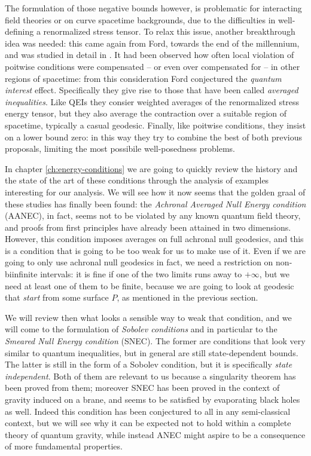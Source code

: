 The formulation of those negative bounds however, is problematic for interacting field theories or on curve spacetime backgrounds, due to the difficulties in well-defining a renormalized stress tensor. To relax this issue, another breakthrough idea was needed: this came again from Ford, towards the end of the millennium, and was studied in detail in \cite[]{ford1999quantum}. It had been observed how often local violation of poitwise conditions were compensated -- or even over compensated for -- in other regions of spacetime: from this consideration Ford conjectured the \emph{quantum interest} effect. Specifically they give rise to those that have been called \emph{averaged inequalities}. Like QEIs they consier weighted averages of the renormalized stress energy tensor, but they also average the contraction over a suitable region of spacetime, typically a casual geodesic. Finally, like poitwise conditions, they insist on a lower bound zero: in this way they try to combine the best of both previous proposals, limiting the most possibile well-posedness problems.

In chapter \ref{ch:energy-conditions} we are going to quickly review the history and the state of the art of these conditions through the analysis of examples interesting for our analysis. We will see how it now seems that the golden graal of these studies has finally been found: the \emph{Achronal Averaged Null Energy condition} (AANEC), in fact, seems not to be violated by any known quantum field theory, and proofs from first principles have already been attained in two dimensions. However, this condition imposes averages on full achronal null geodesics, and this is a condition that is going to be too weak for us to make use of it.
Even if we are going to only use achronal null geodesics in fact, we need a restriction on non-biinfinite intervals: it is fine if one of the two limits runs away to \(+\infty\), but we need at least one of them to be finite, because we are going to look at geodesic that \emph{start} from some surface \(P\), as mentioned in the previous section.

We will review then what looks a sensible way to weak that condition, and we will come to the formulation of \emph{Sobolev conditions} and in particular to the \emph{Smeared Null Energy condition} (SNEC). The former are conditions that look very similar to quantum inequalities, but in general are still state-dependent bounds. The latter is still in the form of a Sobolev condition, but it is specifically \emph{state independent}. Both of them are relevant to us because a singularity theorem has been proved from them; moreover SNEC has been proved in the context of gravity induced on a brane, and seems to be satisfied by evaporating black holes as well. Indeed this condition has been conjectured to all in any semi-classical context, but we will see why it can be expected not to hold within a complete theory of quantum gravity, while instead ANEC might aspire to be a consequence of more fundamental properties.

